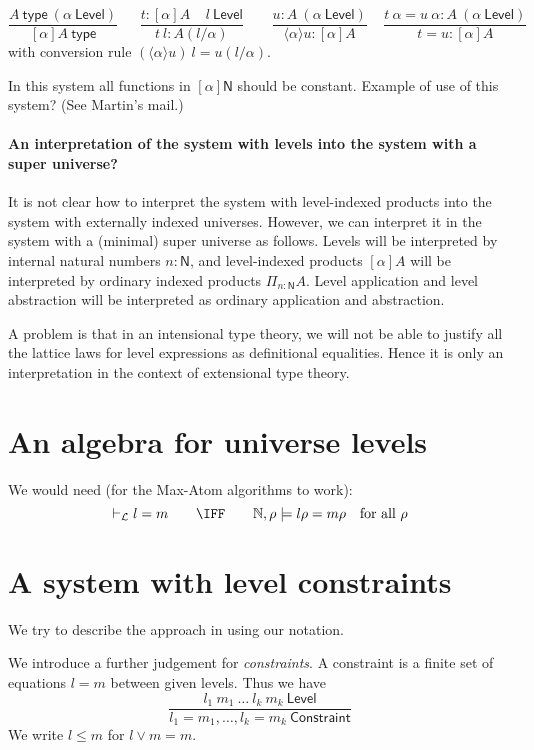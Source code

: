 \documentclass[11pt,a4paper]{article}
\newcommand{\lam}[2]{{\langle}#1{\rangle}#2}
\def\NN{\mathsf{N}}
\def\Level{\mathsf{Level}}
\newcommand{\type}{\mathsf{type}}
\def\Constraint{\mathsf{Constraint}}
\begin{document}
$$
\frac{A~\type~(\alpha~\Level)}{[\alpha]A~\type}~~~~~~~
\frac{t:[\alpha]A~~~~~l~\Level}
     {t~l:A(l/\alpha)}~~~~~~~~~
\frac{u:A~(\alpha~\Level)}{\lam{\alpha}{u}: [\alpha]A}~~~~~
\frac{t~\alpha = u~\alpha:A~(\alpha~\Level)}{t = u:[\alpha]A}
$$
with conversion rule $(\lam{\alpha}{u})~l = u(l/\alpha)$.

In this system all functions in $[\alpha]\NN$
should be constant. Example of use of this system? (See Martin's mail.)

\paragraph{An interpretation of the system with levels into the system with a super universe?} It is not clear how to interpret the system with level-indexed products into the system with externally indexed universes. However, we can interpret it in the system with a (minimal) super universe as follows. Levels will be interpreted by internal natural numbers $n : \NN$, and level-indexed products $[\alpha]A$ will be interpreted by ordinary indexed products $\Pi_{n : \NN}A$. Level application and level abstraction will be interpreted as ordinary application and abstraction. 

A problem is that in an intensional type theory, we will not be able to justify all the lattice laws for level expressions as definitional equalities. Hence it is only an interpretation in the context of extensional type theory.

\section{An algebra for universe levels}

We would need (for the Max-Atom algorithms to work):
\[ 
\vdash_{\cal L} l=m  \quad \quad \IFF \quad \quad \mathbb{N},\rho \models l\rho = m\rho
\text{~~ for all $\rho$}
\]

\section{A system with level constraints}

We try to describe the approach in \cite{VV} using our notation.

We introduce a further judgement for {\em constraints}. A constraint is
a finite set of equations $l = m$ between given levels. Thus we have
$$
\frac{l_1~m_1~\dots~l_k~m_k~\Level}{l_1 = m_1,\dots,l_k = m_k~\Constraint}
$$
We write $l\leqslant m$ for $l\vee m = m$.
\end{document}
